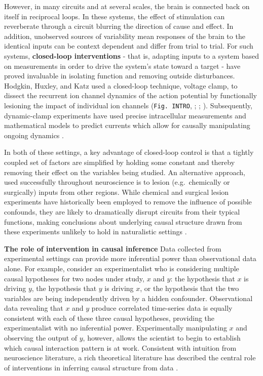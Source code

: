 \documentclass{article}
\begin{document}
However, in many circuits and at several scales, the brain is connected back on itself in reciprocal loops. In these systems, the effect of stimulation can reverberate through a circuit blurring the direction of cause and effect. In addition, unobserved sources of variability mean responses of the brain to the identical inputs can be context dependent and differ from trial to trial. For such systems, \textbf{closed-loop interventions} - that is, adapting inputs to a system based on measurements in order to drive the system's state toward a target - have proved invaluable in isolating function and removing outside disturbances. Hodgkin, Huxley, and Katz used a closed-loop technique, voltage clamp, to dissect the recurrent ion channel dynamics of the action potential by functionally lesioning the impact of individual ion channels (\texttt{Fig.\ INTRO}, \textcite{cole1949dynamic};
\textcite{hodgkin1949effect}; \textcite{hodgkin1952measurement}). Subsequently, dynamic-clamp experiments have used precise intracellular measurements and mathematical models to predict currents which allow for causally manipulating ongoing dynamics
\autocite{sharp1993dynamic,prinz2004dynamic}.

In both of these settings, a key advantage of closed-loop control is that a tightly coupled set of factors are simplified by holding some constant and thereby removing their effect on the variables being studied. An alternative approach, used successfully throughout neuroscience is to lesion (e.g.~chemically or surgically) inputs from other regions. While chemical and surgical lesion experiments have historically been employed to remove the influence of possible confounds, they are likely to dramatically disrupt circuits from their typical functions, making conclusions about underlying causal structure drawn from these experiments unlikely to hold in naturalistic settings
\autocite{chicharro2012when,wolff2018promise,vaidya2019lesion,valero-cabre2020perturbationdriven}.

\textbf{The role of intervention in causal inference} Data collected from experimental settings can provide more inferential power than observational data alone. For example, consider an experimentalist who is considering multiple causal hypotheses for two nodes under study,
\(x\) and \(y\): the hypothesis that \(x\) is driving \(y\), the hypothesis that \(y\) is driving \(x\), or the hypothesis that the two variables are being independently driven by a hidden confounder. Observational data revealing that \(x\) and \(y\) produce correlated time-series data is equally consistent with each of these three causal hypotheses, providing the experimentalist with no inferential power. Experimentally manipulating \(x\) and observing the output of \(y\), however, allows the scientist to begin to establish which causal interaction pattern is at work. Consistent with intuition from neuroscience literature, a rich theoretical literature has described the central role of interventions in inferring causal structure from data
\autocite{pearl2009causality,eberhardt2007interventions}.
\end{document}
